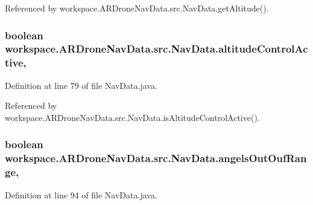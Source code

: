 Referenced by workspace.\+A\+R\+Drone\+Nav\+Data.\+src.\+Nav\+Data.\+get\+Altitude().

\hypertarget{classworkspace_1_1_a_r_drone_nav_data_1_1src_1_1_nav_data_ad6eb7c7c5facb95a474eb4ab91e51925}{}
\subsubsection[{altitude\+Control\+Active}]{\setlength{\rightskip}{0pt plus 5cm}boolean workspace.\+A\+R\+Drone\+Nav\+Data.\+src.\+Nav\+Data.\+altitude\+Control\+Active\hspace{0.3cm}{\ttfamily [static]}, {\ttfamily [protected]}}\label{classworkspace_1_1_a_r_drone_nav_data_1_1src_1_1_nav_data_ad6eb7c7c5facb95a474eb4ab91e51925}


Definition at line 79 of file Nav\+Data.\+java.



Referenced by workspace.\+A\+R\+Drone\+Nav\+Data.\+src.\+Nav\+Data.\+is\+Altitude\+Control\+Active().

\hypertarget{classworkspace_1_1_a_r_drone_nav_data_1_1src_1_1_nav_data_aae2ecaadcf8e1a93d6168702f4f95946}{}
\subsubsection[{angels\+Out\+Ouf\+Range}]{\setlength{\rightskip}{0pt plus 5cm}boolean workspace.\+A\+R\+Drone\+Nav\+Data.\+src.\+Nav\+Data.\+angels\+Out\+Ouf\+Range\hspace{0.3cm}{\ttfamily [static]}, {\ttfamily [protected]}}\label{classworkspace_1_1_a_r_drone_nav_data_1_1src_1_1_nav_data_aae2ecaadcf8e1a93d6168702f4f95946}


Definition at line 94 of file Nav\+Data.\+java.



